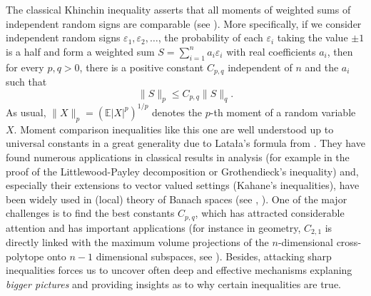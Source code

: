 \documentclass[10pt]{article}
\newcommand{\E}{\mathbb{E}}
\newcommand{\1}{\textbf{1}}
\theoremstyle{remark}
\theoremstyle{definition}
\begin{document}
The classical Khinchin inequality asserts that all moments of weighted sums of independent random signs are comparable (see \cite{Khi}). More specifically, if we consider independent random signs $\varepsilon_1, \varepsilon_2, \ldots$, the probability of each $\varepsilon_i$ taking the value $\pm 1$ is a half and form a weighted sum $S = \sum_{i=1}^n a_i\varepsilon_i$ with real coefficients $a_i$, then for every $p, q > 0$, there is a positive constant $C_{p,q}$ independent of $n$ and the $a_i$ such that
\begin{equation}\label{eq:CK}
\|S\|_p \leq C_{p,q}\|S\|_q.
\end{equation}
As usual, $\|X\|_p = (\E|X|^p)^{1/p}$ denotes the $p$-th moment of a random variable $X$. Moment comparison inequalities like this one are well understood up to universal constants in a great generality due to Lata\l a's formula from \cite{Lat-mom}. They have found numerous applications in classical results in analysis (for example in the proof of the Littlewood-Payley decomposition or Grothendieck's inequality) and, especially their extensions to vector valued settings (Kahane's inequalities), have been widely used in (local) theory of Banach spaces (see \cite{LT}, \cite{MSch}). One of the major challenges is to find the best constants $C_{p,q}$, which has attracted considerable attention and has important applications (for instance in geometry, $C_{2,1}$ is directly linked with the maximum volume projections of the $n$\nobreakdash-dimensional cross-polytope onto $n-1$ dimensional subspaces, see \cite{Ball, BN}). Besides, attacking sharp inequalities forces us to uncover often deep and effective mechanisms explaning \emph{bigger pictures} and providing insights as to why certain inequalities are true.
\end{document}
